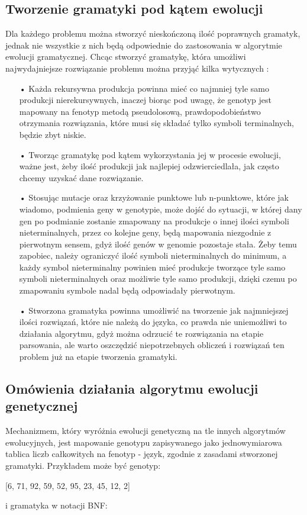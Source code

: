 \subsection{Tworzenie gramatyki pod kątem ewolucji}
\label{grammarCreation}
Dla każdego problemu można stworzyć nieskończoną ilość poprawnych gramatyk, jednak nie wszystkie z nich będą odpowiednie do zastosowania w algorytmie ewolucji gramatycznej. Chcąc stworzyć gramatykę, która umożliwi najwydajniejsze rozwiązanie problemu można przyjąć kilka wytycznych \cite{grammarDesign}: 
\begin{itemize}
  \item[•] Każda rekursywna produkcja powinna mieć co najmniej tyle samo produkcji nierekursywnych, inaczej biorąc pod uwagę, że genotyp jest mapowany na fenotyp metodą pseudolosową, prawdopodobieństwo otrzymania rozwiązania, które musi się składać tylko symboli terminalnych, będzie zbyt niskie.
  \item[•] Tworząc gramatykę pod kątem wykorzystania jej w procesie ewolucji, ważne jest, żeby ilość produkcji jak najlepiej odzwierciedlała, jak często chcemy uzyskać dane rozwiązanie.
  \item[•] Stosując mutacje oraz krzyżowanie punktowe lub n-punktowe, które jak wiadomo, podmienia geny w genotypie, może dojść do sytuacji, w której dany gen po podmianie zostanie zmapowany na produkcje o innej ilości symboli nieterminalnych, przez co kolejne geny, będą mapowania niezgodnie z pierwotnym sensem, gdyż ilość genów w genomie pozostaje stała. Żeby temu zapobiec, należy ograniczyć ilość symboli nieterminalnych do minimum, a każdy symbol nieterminalny powinien mieć produkcje tworzące tyle samo symboli nieterminalnych oraz możliwie tyle samo produkcji, dzięki czemu po zmapowaniu symbole nadal będą odpowiadały pierwotnym. 
  \item[•] Stworzona gramatyka powinna umożliwić na tworzenie jak najmniejszej ilości rozwiązań, które nie należą do języka, co prawda nie uniemożliwi to działania algorytmu, gdyż można odrzucić te rozwiązania na etapie parsowania, ale warto oszczędzić niepotrzebnych obliczeń i rozwiązań ten problem już na etapie tworzenia gramatyki. 
\end{itemize}

\subsection{Omówienia działania algorytmu ewolucji genetycznej}
Mechanizmem, który wyróżnia ewolucji genetyczną na tle innych algorytmów ewolucyjnych, jest mapowanie genotypu zapisywanego jako jednowymiarowa tablica liczb całkowitych na fenotyp - język, zgodnie z zasadami stworzonej gramatyki. Przykładem może być genotyp: 
\begin{center} [6, 71, 92, 59, 52, 95, 23, 45, 12, 2] \end{center}
i gramatyka w notacji BNF:


